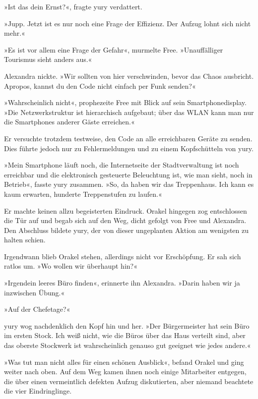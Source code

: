»Ist das dein Ernst?«, fragte yury verdattert.

»Jupp. Jetzt ist es nur noch eine Frage der Effizienz. Der Aufzug lohnt sich nicht mehr.«

»Es ist vor allem eine Frage der Gefahr«, murmelte Free. »Unauffälliger Tourismus sieht anders aus.«

Alexandra nickte. »Wir sollten von hier verschwinden, bevor das Chaos ausbricht. Apropos, kannst du den Code nicht einfach per Funk senden?«

»Wahrscheinlich nicht«, prophezeite Free mit Blick auf sein Smartphonedisplay. »Die Netzwerkstruktur ist hierarchisch aufgebaut; über das WLAN kann man nur die Smartphones anderer Gäste erreichen.«

Er versuchte trotzdem testweise, den Code an alle erreichbaren Geräte zu senden. Dies führte jedoch nur zu Fehlermeldungen und zu einem Kopfschütteln von yury.

»Mein Smartphone läuft noch, die Internetseite der Stadtverwaltung ist noch erreichbar und die elektronisch gesteuerte Beleuchtung ist, wie man sieht, noch in Betrieb«, fasste yury zusammen. »So, da haben wir das Treppenhaus. Ich kann es kaum erwarten, hunderte Treppenstufen zu laufen.«

Er machte keinen allzu begeisterten Eindruck. Orakel hingegen zog entschlossen die Tür auf und begab sich auf den Weg, dicht gefolgt von Free und Alexandra. Den Abschluss bildete yury, der von dieser ungeplanten Aktion am wenigsten zu halten schien.

Irgendwann blieb Orakel stehen, allerdings nicht vor Erschöpfung. Er sah sich ratlos um. »Wo wollen wir überhaupt hin?«

»Irgendein leeres Büro finden«, erinnerte ihn Alexandra. »Darin haben wir ja inzwischen Übung.«

»Auf der Chefetage?«

yury wog nachdenklich den Kopf hin und her. »Der Bürgermeister hat sein Büro im ersten Stock. Ich weiß nicht, wie die Büros über das Haus verteilt sind, aber das oberste Stockwerk ist wahrscheinlich genauso gut geeignet wie jedes andere.«

»Was tut man nicht alles für einen schönen Ausblick«, befand Orakel und ging weiter nach oben. Auf dem Weg kamen ihnen noch einige Mitarbeiter entgegen, die über einen vermeintlich defekten Aufzug diskutierten, aber niemand beachtete die vier Eindringlinge.

\cleardoubleevenpage

